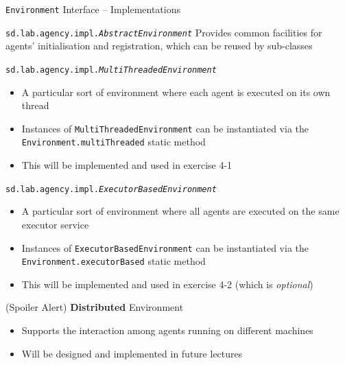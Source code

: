 \documentclass[presentation]{beamer}\mode<presentation>{\usetheme{AMSCesenaPurpleAndGold}}
\newcommand{\labN}{4}
\begin{document}
\begin{frame}[allowframebreaks]{\texttt{Environment} Interface -- Implementations}

    \begin{block}{\texttt{sd.lab.agency.impl.\textit{AbstractEnvironment}}}
        Provides common facilities for agents' initialisation and registration, which can be reused by sub-classes
    \end{block}

    \bigskip

    \begin{exampleblock}{\texttt{sd.lab.agency.impl.\textit{MultiThreadedEnvironment}}}
        \begin{itemize}
			\item A particular sort of environment where each agent is executed on its own thread
			\item Instances of \texttt{MultiThreadedEnvironment} can be instantiated via the \alert{\texttt{Environment.multiThreaded}} static method
			\item This will be implemented and used in exercise \labN{}-1
        \end{itemize}
    \end{exampleblock}

	\bigskip

	\begin{exampleblock}{\texttt{sd.lab.agency.impl.\textit{ExecutorBasedEnvironment}}}
		\begin{itemize}
			\item A particular sort of environment where all agents are executed on the same executor service
			\item Instances of \texttt{ExecutorBasedEnvironment} can be instantiated via the \alert{\texttt{Environment.executorBased}} static method
			\item This will be implemented and used in exercise \labN{}-2 (which is \emph{optional})
		\end{itemize}
	\end{exampleblock}

    \bigskip

    \begin{alertblock}{(Spoiler Alert) \textbf{Distributed} Environment}
        \begin{itemize}
        	\item Supports the interaction among agents running on different machines
        	\item Will be designed and implemented in future lectures
        \end{itemize}
    \end{alertblock}

\end{frame}
\end{document}
